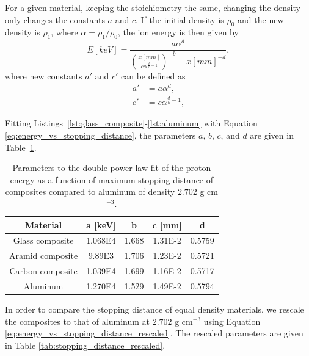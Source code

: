 \documentclass{hitec}
\begin{document}
For a given material, keeping the stoichiometry the same, changing the density only changes the constants $a$ and $c$. If the initial density is $\rho_0$ and the new density is $\rho_1$, where $\alpha = \rho_1/\rho_0$, the ion energy is then given by
\begin{equation}\label{eq:energy_vs_stopping_distance_rescaled}
E[keV] = \frac{a\alpha^d}{\left(\frac{x[mm]}{c\alpha^{\frac{d}{b}-1}}\right)^{-b} + x[mm]^{-d}},
\end{equation}
where new constants $a'$ and $c'$ can be defined as
\begin{align}
a' &= a\alpha^d, \\
c' &= c\alpha^{\frac{d}{b}-1},
\end{align}

Fitting Listings~\ref{lst:glass_composite}-\ref{lst:aluminum} with Equation \ref{eq:energy_vs_stopping_distance}, the parameters $a$, $b$, $c$, and $d$ are given in Table~\ref{tab:stopping_distance}.

\begin{table}[h]\centering
	\caption{Parameters to the double power law fit of the proton energy as a function of maximum stopping distance of composites compared to aluminum of density $2.702$ g cm$^{-3}$.}\label{tab:stopping_distance}
	\begin{tabular}{|c | c | c | c | c |}\hline
		Material & a [keV] & b & c [mm] & d \\\hline
		Glass composite  & 1.068E4 & 1.668 & 1.31E-2 & 0.5759 \\\hline
		Aramid composite & 9.89E3  & 1.706 & 1.23E-2 & 0.5721  \\\hline
		Carbon composite & 1.039E4 & 1.699 & 1.16E-2 & 0.5717 \\\hline
		Aluminum         & 1.270E4 & 1.529 & 1.49E-2 & 0.5794 \\\hline
	\end{tabular}
\end{table}

In order to compare the stopping distance of equal density materials, we rescale the composites to that of aluminum at $2.702$ g cm$^{-3}$ using Equation \ref{eq:energy_vs_stopping_distance_rescaled}. The rescaled parameters are given in Table \ref{tab:stopping_distance_rescaled}.
\end{document}
